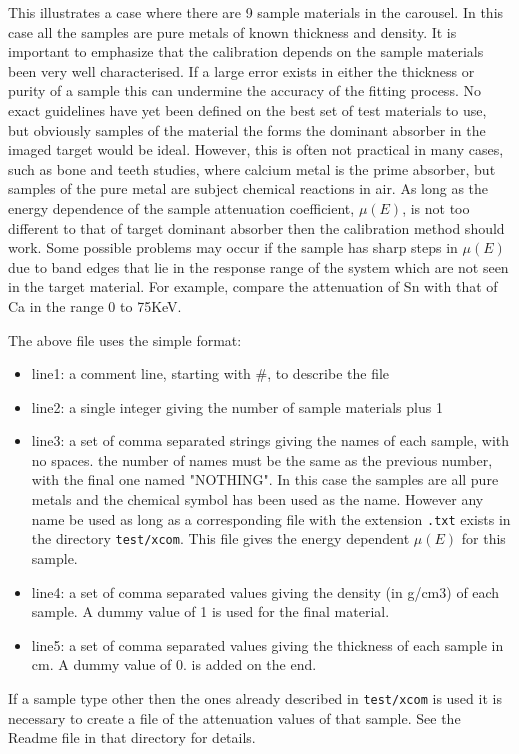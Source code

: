 \documentclass[a4paper]{article}
\begin{document}
This illustrates a case where there are 9 sample materials in the carousel.
In this case all the samples are pure metals of known thickness and density.
It is important to emphasize that the calibration depends on the sample materials
been very well characterised.
If a large error exists in either the thickness or purity of a sample this can undermine
the accuracy of the fitting process.
No exact guidelines have yet been defined on the best set of test materials to use, but obviously
samples of the material the forms the dominant absorber in the imaged target would be ideal.
However, this is often not practical in many cases, such as bone and teeth studies, where calcium metal
is the prime absorber, but samples of the pure metal are subject chemical reactions in air.
As long as the energy dependence of the sample attenuation coefficient, $\mu(E)$, is not too different to that of
target dominant absorber then the calibration method should work.
Some possible problems may occur if the sample has sharp steps in $\mu(E)$ due to band edges that lie in the
response range of the system which are not seen in the target material.
For example, compare the attenuation of Sn with that of Ca in the range 0 to 75KeV.

The above file uses the simple format:
\begin{itemize}
\item{line1:} a comment line, starting with #, to describe the file
\item{line2:} a single integer giving the number of sample materials plus 1
\item{line3:} a set of comma separated strings giving the names of each sample, with no spaces. the
number of names must be the same as the previous number, with the final one named "NOTHING".
In this case the samples are all pure metals and the chemical symbol has been used as the name.
However any name be used as long as a corresponding file with the extension \texttt{.txt} exists
in the directory \texttt{test/xcom}. This file gives the energy dependent $\mu(E)$ for this sample.
\item{line4:} a set of comma separated values giving the density (in g/cm3) of each sample. A dummy
value of 1 is used for the final material.
\item{line5:} a set of comma separated values giving the thickness of each sample in cm. A dummy value of
0. is added on the end.
\end{itemize}
If a sample type other then the ones already described in \texttt{test/xcom} is used it is necessary to
create a file of the attenuation values of that sample.
See the Readme file in that directory for details.
\end{document}

